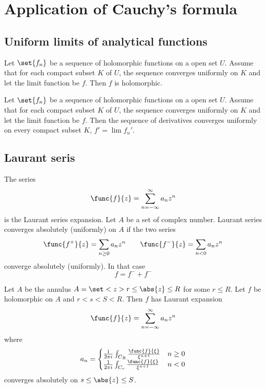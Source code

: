 \chapter{Application of Cauchy's formula}
\section{Uniform limits of analytical functions}
\begin{theorem}
    Let \(\set{f_n}\) be a sequence of holomorphic functions on a open set \(U\). Assume that for each compact subset \(K\) of \(U\), the sequence converges uniformly on \(K\) and let the limit function be \(f\). Then \(f\) is holomorphic.
\end{theorem}

\begin{theorem}
    Let \(\set{f_n}\) be a sequence of holomorphic functions on a open set \(U\). Assume that for each compact subset \(K\) of \(U\), the sequence converges uniformly on \(K\) and let the limit function be \(f\). Then the sequence of derivatives converges uniformly on every compact subset \(K\), \(f' = \lim f_n'\).
\end{theorem}

\section{Laurant seris}
The series 
\begin{equation*}
    \func{f}{z } = \sum_{n = -\infty}^{\infty} a_n z^n
\end{equation*}
is the Laurant series expansion. Let \(A\) be a set of complex number. Laurant series converges absolutely (uniformly) on \(A\) if the two series 
\begin{equation*}
    \func{f^+}{z} = \sum_{n \geq 0} a_n z^n \qquad \func{f^-}{z} = \sum_{n < 0} a_n z^n
\end{equation*}  
converge absolutely (uniformly). In that case 
\begin{equation*}
    f = f^{-} + f^{-}
\end{equation*}

\begin{theorem}
    Let \(A\) be the annulus \(A = \set<z>{r \leq \abs{z} \leq R}\) for some \(r \leq R\). Let \(f\) be holomorphic on \(A\) and \(r < s < S < R\). Then \(f\) has Laurant expansion 
    \begin{equation*}
        \func{f}{z} = \sum_{n = -\infty}^{\infty} a_n z^n
    \end{equation*}
    where
    \begin{equation*}
        a_n = \begin{cases}
            \frac{1}{2 \pi i} \int_{C_R} \frac{\func{f}{\xi}}{\xi^{n+1}} & n \geq 0 \\
            \frac{1}{2 \pi i} \int_{C_r} \frac{\func{f}{\xi}}{\xi^{n+1}} & n < 0 \\
        \end{cases}
    \end{equation*}
    converges absolutely on \(s \leq \abs{z} \leq S\).
\end{theorem}

